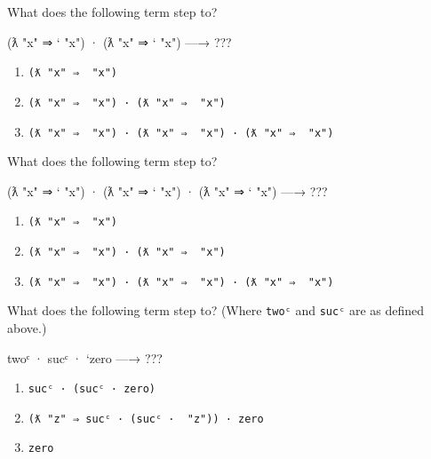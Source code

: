 What does the following term step to?

\begin{myDisplay}
(ƛ "x" ⇒ ` "x") · (ƛ "x" ⇒ ` "x")  —→  ???
\end{myDisplay}

\begin{enumerate}
\def\labelenumi{\arabic{enumi}.}
\tightlist
\item
  \texttt{(ƛ\ "x"\ ⇒\ \textasciigrave{}\ "x")}
\item
  \texttt{(ƛ\ "x"\ ⇒\ \textasciigrave{}\ "x")\ ·\ (ƛ\ "x"\ ⇒\ \textasciigrave{}\ "x")}
\item
  \texttt{(ƛ\ "x"\ ⇒\ \textasciigrave{}\ "x")\ ·\ (ƛ\ "x"\ ⇒\ \textasciigrave{}\ "x")\ ·\ (ƛ\ "x"\ ⇒\ \textasciigrave{}\ "x")}
\end{enumerate}

What does the following term step to?

\begin{myDisplay}
(ƛ "x" ⇒ ` "x") · (ƛ "x" ⇒ ` "x") · (ƛ "x" ⇒ ` "x")  —→  ???
\end{myDisplay}

\begin{enumerate}
\def\labelenumi{\arabic{enumi}.}
\tightlist
\item
  \texttt{(ƛ\ "x"\ ⇒\ \textasciigrave{}\ "x")}
\item
  \texttt{(ƛ\ "x"\ ⇒\ \textasciigrave{}\ "x")\ ·\ (ƛ\ "x"\ ⇒\ \textasciigrave{}\ "x")}
\item
  \texttt{(ƛ\ "x"\ ⇒\ \textasciigrave{}\ "x")\ ·\ (ƛ\ "x"\ ⇒\ \textasciigrave{}\ "x")\ ·\ (ƛ\ "x"\ ⇒\ \textasciigrave{}\ "x")}
\end{enumerate}

What does the following term step to? (Where \texttt{twoᶜ} and
\texttt{sucᶜ} are as defined above.)

\begin{myDisplay}
twoᶜ · sucᶜ · `zero  —→  ???
\end{myDisplay}

\begin{enumerate}
\def\labelenumi{\arabic{enumi}.}
\tightlist
\item
  \texttt{sucᶜ\ ·\ (sucᶜ\ ·\ \textasciigrave{}zero)}
\item
  \texttt{(ƛ\ "z"\ ⇒\ sucᶜ\ ·\ (sucᶜ\ ·\ \textasciigrave{}\ "z"))\ ·\ \textasciigrave{}zero}
\item
  \texttt{\textasciigrave{}zero}
\end{enumerate}

